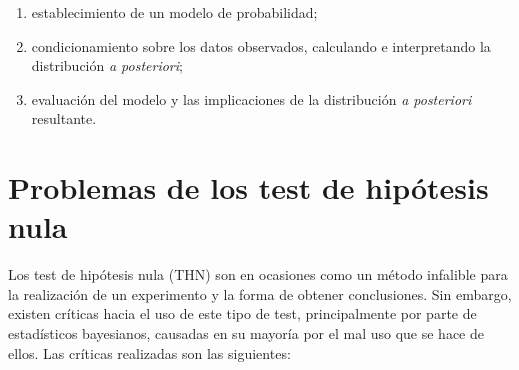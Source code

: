 	\begin{enumerate}
	\item establecimiento de un modelo de probabilidad;
	\item condicionamiento sobre los datos observados,
		calculando e interpretando la distribución 
		\textit{a posteriori};
	\item evaluación del modelo y las implicaciones de la
		distribución \textit{a posteriori} resultante.
	\end{enumerate}

\section{Problemas de los test de hipótesis nula}	

	Los test de hipótesis nula (THN) son en ocasiones como un
método infalible para la realización de un experimento y la
forma de obtener conclusiones. Sin embargo, existen críticas
hacia el uso de este tipo de test, principalmente por parte 
de estadísticos bayesianos, causadas en su mayoría por el mal
uso que se hace de ellos. Las críticas realizadas son las
siguientes:

